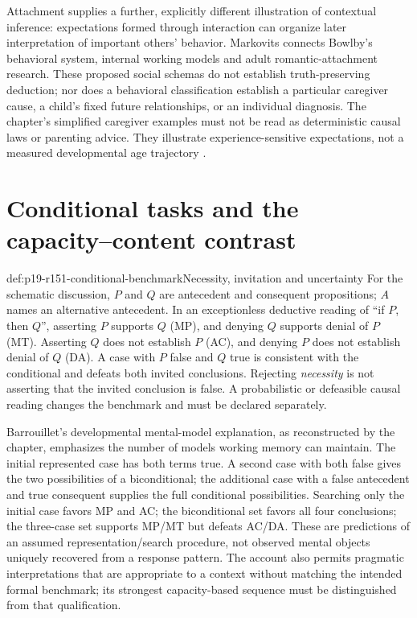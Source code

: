 Attachment supplies a further, explicitly different illustration of contextual
inference: expectations formed through interaction can organize later
interpretation of important others' behavior. Markovits connects Bowlby's
behavioral system, internal working models and adult romantic-attachment
research. These proposed social schemas do not establish truth-preserving
deduction; nor does a behavioral classification establish a particular caregiver
cause, a child's fixed future relationships, or an individual diagnosis.
The chapter's simplified caregiver examples must not be read as deterministic
causal laws or parenting advice. They illustrate experience-sensitive expectations,
not a measured developmental age trajectory
\cite[pp.~783--784]{Markovits2021DevelopmentRationality}.

\section{Conditional tasks and the capacity--content contrast}
\label{sec:p19-r151-conditionals}

\begin{hbconvention}{def:p19-r151-conditional-benchmark}{Necessity, invitation and uncertainty}
For the schematic discussion, \(P\) and \(Q\) are antecedent and consequent
propositions; \(A\) names an alternative antecedent. In an exceptionless
deductive reading of ``if \(P\), then \(Q\)'', asserting \(P\) supports
\(Q\) (MP), and denying \(Q\) supports denial of \(P\) (MT).
Asserting \(Q\) does not establish \(P\) (AC), and denying \(P\)
does not establish denial of \(Q\) (DA). A case with \(P\) false and
\(Q\) true is consistent with the conditional and defeats both invited
conclusions. Rejecting \emph{necessity} is not asserting that the invited
conclusion is false. A probabilistic or defeasible causal reading changes
the benchmark and must be declared separately.
\end{hbconvention}

Barrouillet's developmental mental-model explanation, as reconstructed by the
chapter, emphasizes the number of models working memory can maintain. The
initial represented case has both terms true. A second case with both false
gives the two possibilities of a biconditional; the additional case with a false
antecedent and true consequent supplies the full conditional possibilities.
Searching only the initial case favors MP and AC; the biconditional set favors
all four conclusions; the three-case set supports MP/MT but defeats AC/DA.
These are predictions of an assumed representation/search procedure, not
observed mental objects uniquely recovered from a response pattern. The
account also permits pragmatic interpretations that are appropriate to a
context without matching the intended formal benchmark; its strongest
capacity-based sequence must be distinguished from that qualification.

